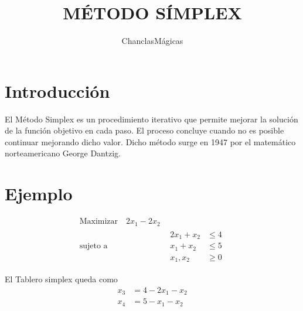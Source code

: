 \documentclass{article}
\title{MÉTODO SÍMPLEX}
\author{ChanclasMágicas}
\begin{document}
\maketitle
\tableofcontents

\section{Introducción}
\label{sec:introduccion}

El Método Simplex es un procedimiento iterativo que permite mejorar la
solución de la función objetivo en cada paso. El proceso concluye
cuando no es posible continuar mejorando dicho valor.
Dicho método surge en 1947 por el matemático norteamericano George
Dantzig.

\section{Ejemplo}
\label{sec:ejemplo}

\begin{equation*}
  \begin{aligned}
    \text{Maximizar}    \quad  2x_1-2x_2\\
    \text{sujeto a}    \quad &
    \begin{aligned}
      2x_1+x_2 & \leq 4 \\
      x_1+x_2 & \leq 5\\
      x_1,x_2 & \geq 0

    \end{aligned}
  \end{aligned}
\end{equation*}

El Tablero simplex queda como\\
\begin{equation*}
 
    \begin{aligned}
      x_3 & = 4-2x_1-x_2 \\
      x_4 & = 5-x_1-x_2\\

  \end{aligned}
\end{equation*}
\end{document}
